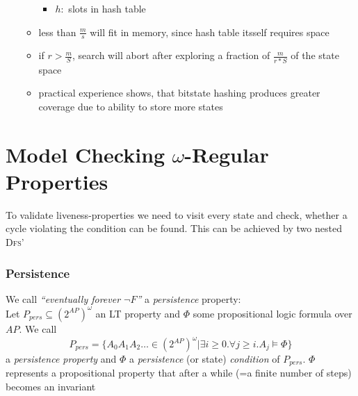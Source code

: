 \documentclass[a4paper, 10pt]{article}
\begin{document}
\begin{itemize}
\begin{itemize}
\begin{itemize}
            \item $h:$ slots in hash table
        \end{itemize}
        \item less than $\frac{m}{s}$ will fit in memory, since hash table itsself requires space
        \item if $r>\frac{m}{S}$, search will abort after exploring a fraction of $\frac{m}{r*S}$ of the state space
        \item practical experience shows, that bitstate hashing produces greater coverage due to ability to store more states
    \end{itemize}
\end{itemize}

\section*{Model Checking $\omega$-Regular Properties}
To validate liveness-properties we need to visit every state and check, whether a cycle violating the condition can be found. This can be achieved by two nested \textsc{Dfs}'
\subsubsection*{Persistence}
\begin{shaded}
We call \emph{``eventually forever $\neg F$''} a \emph{persistence} property: \\
Let $P_{pers}\subseteq(2^{AP})^\omega$ an LT property and $\Phi$ some propositional logic formula over $AP$. We call
\[ P_{pers}=\{ A_0A_1A_2\dots\in(2^{AP})^\omega | \exists i\geq0.\forall j\geq i.A_j\models\Phi \} \]
a \emph{persistence property} and $\Phi$ a \emph{persistence} (or state) \emph{condition} of $P_{pers}$. $\Phi$ represents a propositional property that after a while (=a finite number of steps) becomes an invariant
\end{shaded}
\end{document}
